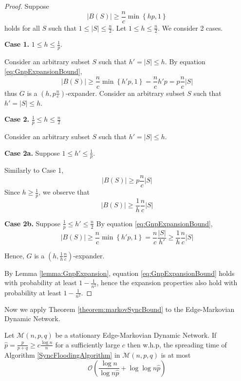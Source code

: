 \begin{proof}
	Suppose 
	\begin{equation}\label{eq:GnpExpansionBound}
		|B(S)| \geq \frac{n}{c} \min \left\{ h p, 1 \right\} 
	\end{equation}
	holds for all $S$ such that $1 \leq |S| \leq \frac{n}{2}$. 
	Let $1 \leq h \leq \frac{n}{2}$. We consider 2 cases. 

	\textbf{Case 1.} $1 \leq h \leq \frac{1}{p}$. 

	Consider an arbitrary subset $S$ such that $h' = |S| \leq h$.
	By equation \ref{eq:GnpExpansionBound}, 
	$$
		|B(S)| \geq \frac{n}{c} \min \left\{ h' p, 1 \right\} = \frac{n}{c}h'p = p\frac{n}{c} |S|
	$$
	thus $G$ is a $(h, p\frac{n}{c})$-expander.
	Consider an arbitrary subset $S$ such that $h' = |S| \leq h$. 

	\textbf{Case 2.} $\frac{1}{p} \leq h \leq \frac{n}{2}$

	Consider an arbitrary subset $S$ such that $h' = |S| \leq h$.

	\textbf{Case 2a.}
	Suppose $1 \leq h' \leq \frac{1}{p}$. 
	
	Similarly to Case 1, 
	$$
		|B(S)| \geq p\frac{n}{c} |S|
	$$
	Since $h \geq \frac{1}{p}$, we observe that 
	$$
		|B(S)| \geq \frac{1}{h}  \frac{n}{c} |S|
	$$ 

	\textbf{Case 2b.} Suppose $\frac{1}{p} \leq h' \leq \frac{n}{2}$
	By equation \ref{eq:GnpExpansionBound}, 
	$$
		|B(S)| 
		\geq \frac{n}{c} \min \left\{ h' p, 1 \right\} 
		= \frac{n}{c}\frac{|S|}{h'} 
		\geq \frac{1}{h} \frac{n}{c}|S|
	$$

	Hence, $G$ is a $(h, \frac{1}{h} \frac{n}{c})$-expander.

	By Lemma \ref{lemma:GnpExpansion}, equation \ref{eq:GnpExpansionBound} holds with probability at least $1 - \frac{1}{n^2}$, hence the expansion properties also hold with probability at least $1 - \frac{1}{n^2}$.
\end{proof}

Now we apply Theorem \ref{theorem:markovSyncBound} to the Edge-Markovian Dynamic Network.

\begin{theorem}\label{theorem:edgeMarkovianFloodingBound}
	Let $\mathcal{M}(n, p, q)$ be a stationary Edge-Markovian Dynamic Network. If $\hat{p} = \frac{p}{p+q} \geq c \frac{\log n}{n}$ for a sufficiently large $c$ then w.h.p, the spreading time of Algorithm \ref{SyncFloodingAlgorithm} in $\mathcal{M}(n, p, q)$ is at most
	$$
		\mathcal{O}\left(\frac{\log n}{\log n\hat{p}} + \log \log n\hat{p} \right)
	$$
\end{theorem}

